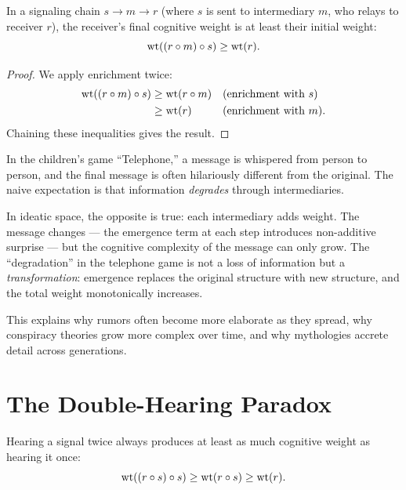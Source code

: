 \begin{theorem}
\label{thm:chain-enrichment}
In a signaling chain $s \to m \to r$ (where $s$ is sent to intermediary $m$, who relays to receiver $r$), the receiver's final cognitive weight is at least their initial weight:
\[
\operatorname{wt}((r \circ m) \circ s) \geq \operatorname{wt}(r).
\]
\end{theorem}

\begin{proof}
We apply enrichment twice:
\begin{align*}
\operatorname{wt}((r \circ m) \circ s) &\geq \operatorname{wt}(r \circ m) && \text{(enrichment with } s\text{)} \\
&\geq \operatorname{wt}(r) && \text{(enrichment with } m\text{)}.
\end{align*}
Chaining these inequalities gives the result.
\end{proof}

\begin{paradox}
In the children's game ``Telephone,'' a message is whispered from person to person, and the final message is often hilariously different from the original. The naive expectation is that information \emph{degrades} through intermediaries.

In ideatic space, the opposite is true: each intermediary adds weight. The message changes --- the emergence term at each step introduces non-additive surprise --- but the cognitive complexity of the message can only grow. The ``degradation'' in the telephone game is not a loss of information but a \emph{transformation}: emergence replaces the original structure with new structure, and the total weight monotonically increases.

This explains why rumors often become more elaborate as they spread, why conspiracy theories grow more complex over time, and why mythologies accrete detail across generations.
\end{paradox}

\section{The Double-Hearing Paradox}

\begin{theorem}
\label{thm:double-hearing}
Hearing a signal twice always produces at least as much cognitive weight as hearing it once:
\[
\operatorname{wt}((r \circ s) \circ s) \geq \operatorname{wt}(r \circ s) \geq \operatorname{wt}(r).
\]
\end{theorem}

